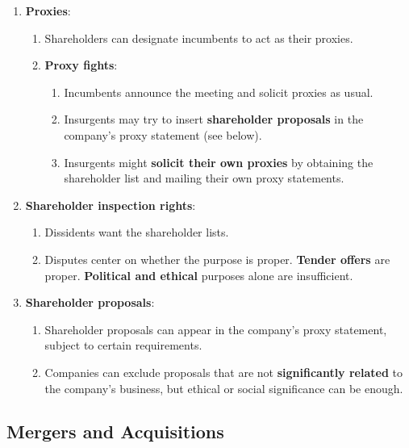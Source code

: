 \begin{enumerate}
    \item \textbf{Proxies}:
    \begin{enumerate}
        \item Shareholders can designate incumbents to act as their proxies.
        \item \textbf{Proxy fights}:
        \begin{enumerate}
            \item Incumbents announce the meeting and solicit proxies as usual.
            \item Insurgents may try to insert \textbf{shareholder proposals} 
            in the company's proxy statement (see below).
            \item Insurgents might \textbf{solicit their own proxies} by 
            obtaining the shareholder list and mailing their own proxy 
            statements.
        \end{enumerate}
    \end{enumerate}
    \item \textbf{Shareholder inspection rights}:
    \begin{enumerate}
        \item Dissidents want the shareholder lists.
        \item Disputes center on whether the purpose is proper. \textbf{Tender 
        offers} are proper. \textbf{Political and ethical} purposes alone are 
        insufficient.
    \end{enumerate}
    \item \textbf{Shareholder proposals}:
    \begin{enumerate}
        \item Shareholder proposals can appear in the company's proxy 
        statement, subject to certain requirements.
        \item Companies can exclude proposals that are not 
        \textbf{significantly related} to the company's business, but ethical 
        or social significance can be enough.
    \end{enumerate}
\end{enumerate}

\newpage

\subsection{Mergers and Acquisitions}


